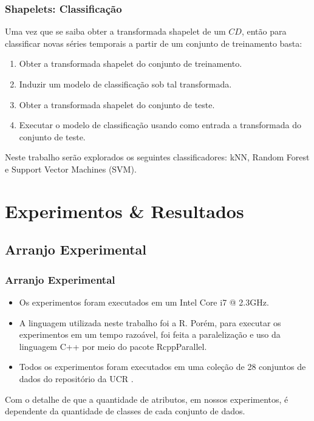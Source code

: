 \documentclass{beamer}
\begin{document}

\begin{frame}
\frametitle{Shapelets: Classifica{\c c}{\~a}o}

Uma vez que se saiba obter a transformada shapelet de um $CD$, ent{\~a}o para classificar novas s{\'e}ries temporais a partir de um conjunto de treinamento basta:

\begin{enumerate}
\item Obter a transformada shapelet do conjunto de treinamento.
\item Induzir um modelo de classifica{\c c}{\~a}o sob tal transformada.
\item Obter a transformada shapelet do conjunto de teste.
\item Executar o modelo de classifica{\c c}{\~a}o usando como entrada a transformada do conjunto de teste.
\end{enumerate}

Neste trabalho ser{\~a}o explorados os seguintes classificadores: kNN, Random Forest e Support Vector Machines (SVM).

\end{frame}

\section{Experimentos \& Resultados}

\subsection{Arranjo Experimental}
\begin{frame}
\frametitle{Arranjo Experimental}
\begin{itemize}
\item Os experimentos foram executados em um Intel Core i7 @ 2.3GHz.
\item A linguagem utilizada neste trabalho foi a R. Por{\'e}m, para executar os experimentos em um tempo razo{\'a}vel, foi feita a paraleliza{\c c}{\~a}o e uso da linguagem C++ por meio do pacote RcppParallel.
\item Todos os experimentos foram executados em uma cole{\c c}{\~a}o de 28 conjuntos de dados do reposit{\'o}rio da UCR \cite{UCRArchive}.
\end{itemize}

Com o detalhe de que a quantidade de atributos, em nossos experimentos, {\'e} dependente da quantidade de classes de cada conjunto de dados.
\end{frame}
\end{document}
